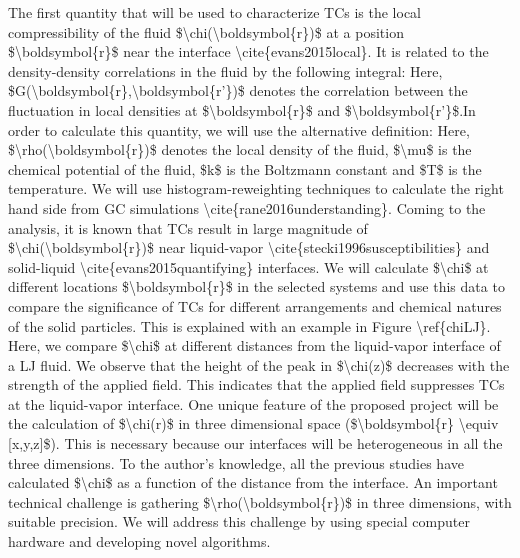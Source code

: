 \par The first quantity that will be used to characterize TCs is the local compressibility of the fluid \$\textbackslash chi(\textbackslash boldsymbol\{r\})\$ at a position \$\textbackslash boldsymbol\{r\}\$ near the interface \textbackslash cite\{evans2015local\}. It is related to the density-density correlations in the fluid by the following integral: Here, \$G(\textbackslash boldsymbol\{r\},\textbackslash boldsymbol\{r'\})\$ denotes the correlation between the fluctuation in local densities at \$\textbackslash boldsymbol\{r\}\$ and \$\textbackslash boldsymbol\{r'\}\$.In order to calculate this quantity, we will use the alternative definition: Here, \$\textbackslash rho(\textbackslash boldsymbol\{r\})\$ denotes the local density of the fluid, \$\textbackslash mu\$ is the chemical potential of the fluid, \$k\$ is the Boltzmann constant and \$T\$ is the temperature. We will use histogram-reweighting techniques to calculate the right hand side from GC simulations \textbackslash cite\{rane2016understanding\}. Coming to the analysis, it is known that TCs result in large magnitude of \$\textbackslash chi(\textbackslash boldsymbol\{r\})\$ near liquid-vapor \textbackslash cite\{stecki1996susceptibilities\} and solid-liquid \textbackslash cite\{evans2015quantifying\} interfaces. We will calculate \$\textbackslash chi\$ at different locations \$\textbackslash boldsymbol\{r\}\$ in the selected systems and use this data to compare the significance of TCs for different arrangements and chemical natures of the solid particles. This is explained with an example in Figure \textbackslash ref\{chiLJ\}. Here, we compare \$\textbackslash chi\$ at different distances from the liquid-vapor interface of a LJ fluid. We observe that the height of the peak in \$\textbackslash chi(z)\$ decreases with the strength of the applied field. This indicates that the applied field suppresses TCs at the liquid-vapor interface. One unique feature of the proposed project will be the calculation of \$\textbackslash chi(r)\$ in three dimensional space (\$\textbackslash boldsymbol\{r\} \textbackslash equiv [x,y,z]\$). This is necessary because our interfaces will be heterogeneous in all the three dimensions. To the author's knowledge, all the previous studies have calculated \$\textbackslash chi\$ as a function of the distance from the interface. An important technical challenge is gathering \$\textbackslash rho(\textbackslash boldsymbol\{r\})\$ in three dimensions, with suitable precision. We will address this challenge by using special computer hardware and developing novel algorithms.
